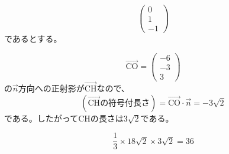 \documentclass[dvipdfmx,uplatex,b5paper]{jsarticle}
\newcommand{\Vector}[1]{\overrightarrow{\text{#1}}}
\begin{document}
\begin{enumarabicp}
\[\begin{pmatrix}
    0 \\ 1 \\ -1
  \end{pmatrix}\]
  であるとする。
  \item \[\Vector{CO} = \begin{pmatrix}
    -6 \\ -3 \\ 3
  \end{pmatrix} \]
  の$\overrightarrow{n}$方向への正射影が$\Vector{CH}$なので、
  \[ (\Vector{CH}\text{の符号付長さ}) = \Vector{CO}\cdot \overrightarrow{n}=-3\sqrt{2} \]
  である。したがってCHの長さは$\boxed{3\sqrt{2}}$である。
  \item \[ \frac{1}{3}\times 18\sqrt{2}\times 3\sqrt{2} = \boxed{36} \]
\end{enumarabicp}
\end{document}
